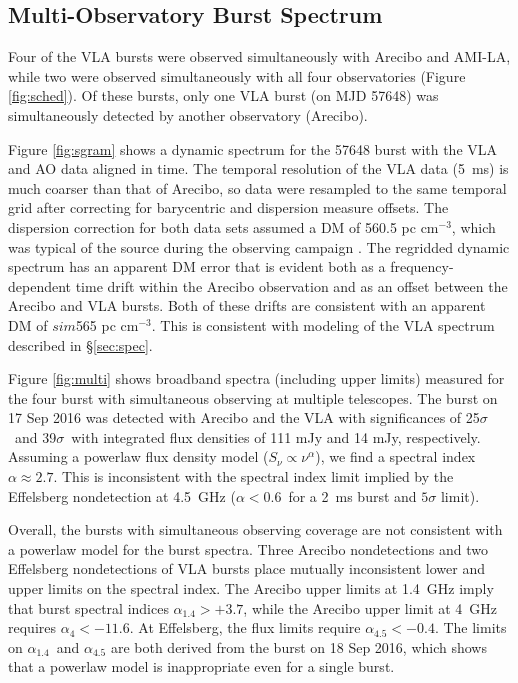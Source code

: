 \documentclass[twocolumn]{aastex61}
\begin{document}
\subsection{Multi-Observatory Burst Spectrum}

Four of the VLA bursts were observed simultaneously with Arecibo and AMI-LA, while two were observed simultaneously with all four observatories (Figure \ref{fig:sched}). Of these bursts, only one VLA burst (on MJD 57648) was simultaneously detected by another observatory (Arecibo). 

Figure \ref{fig:sgram} shows a dynamic spectrum for the 57648 burst with the VLA and AO data aligned in time. The temporal resolution of the VLA data (5~ms) is much coarser than that of Arecibo, so data were resampled to the same temporal grid after correcting for barycentric and dispersion measure offsets. The dispersion correction for both data sets assumed a DM of 560.5 pc cm$^{-3}$, which was typical of the source during the observing campaign \citep{WEIRD}. The regridded dynamic spectrum has an apparent DM error that is evident both as a frequency-dependent time drift within the Arecibo observation and as an offset between the Arecibo and VLA bursts. Both of these drifts are consistent with an apparent DM of $sim$565 pc cm$^{-3}$. This is consistent with modeling of the VLA spectrum described in \S \ref{sec:spec}.

Figure \ref{fig:multi} shows broadband spectra (including upper limits) measured for the four burst with simultaneous observing at multiple telescopes. The burst on 17 Sep 2016 was detected with Arecibo and the VLA with significances of 25$\sigma$\ and 39$\sigma$\ with integrated flux densities of 111 mJy and 14 mJy, respectively. Assuming a powerlaw flux density model ($S_{\nu} \propto \nu^{\alpha}$), we find a spectral index $\alpha\approx2.7$. This is inconsistent with the spectral index limit implied by the Effelsberg nondetection at 4.5~GHz ($\alpha<0.6$\ for a 2~ms burst and $5\sigma$ limit).

Overall, the bursts with simultaneous observing coverage are not consistent with a powerlaw model for the burst spectra. Three Arecibo nondetections and two Effelsberg nondetections of VLA bursts place mutually inconsistent lower and upper limits on the spectral index. The Arecibo upper limits at 1.4~GHz imply that burst spectral indices $\alpha_{1.4}>+3.7$, while the Arecibo upper limit at 4~GHz requires $\alpha_4<-11.6$. At Effelsberg, the flux limits require $\alpha_{4.5}<-0.4$. The limits on $\alpha_{1.4}$\ and $\alpha_{4.5}$ are both derived from the burst on 18 Sep 2016, which shows that a powerlaw model is inappropriate even for a single burst.
\end{document}
